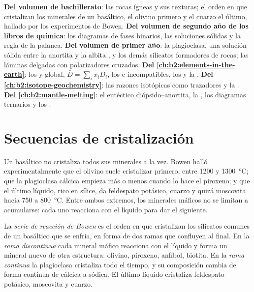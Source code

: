 \begin{recall}
\textbf{Del volumen de bachillerato}: las rocas ígneas y sus texturas; el orden
en que cristalizan los minerales de un  basáltico, el olivino primero y el cuarzo el último,
hallado por los experimentos de Bowen. \textbf{Del volumen de segundo año de los libros de química}:
los diagramas de fases binarios, las soluciones sólidas y la regla de la palanca. \textbf{Del volumen
de primer año}: la plagioclasa, una solución sólida entre la anortita  y la albita
, y los demás silicatos formadores de rocas; las láminas delgadas con polarizadores
cruzados. \textbf{Del \cref{ch:b2:elements-in-the-earth}}: los 
y global, $\bar D = \sum_i x_i D_i$, los  e incompatibles,
los  y la . \textbf{Del
\cref{ch:b2:isotope-geochemistry}}: las razones isotópicas como trazadores y la . \textbf{Del \cref{ch:b2:mantle-melting}}: el eutéctico diópsido--anortita,
la , los diagramas ternarios y los .
\end{recall}

\section{Secuencias de cristalización}\label{sec:b2:magmatic-differentiation:sequences}

Un  basáltico no cristaliza todos sus minerales a la vez. Bowen halló
experimentalmente que el olivino suele cristalizar primero, entre 1200 y
\qty{1300}{\celsius}; que la plagioclasa cálcica empieza más o menos cuando lo hace
el piroxeno; y que el último líquido, rico en sílice, da feldespato potásico, cuarzo y
quizá moscovita hacia 750 a \qty{800}{\celsius}. Entre ambos extremos, los minerales
máficos no se limitan a acumularse: cada uno reacciona con el líquido para dar el siguiente.

\begin{definition}\label{def:b2:magmatic-differentiation:bowen}
La \emph{serie de reacción de Bowen} es el orden en que
cristalizan los silicatos comunes de un  basáltico que se enfría, en forma de dos ramas
que confluyen al final. En la \emph{rama discontinua} cada mineral máfico
reacciona con el líquido y forma un mineral nuevo de otra estructura: olivino,
piroxeno, anfíbol, biotita. En la \emph{rama continua} la plagioclasa
cristaliza todo el tiempo, y su composición cambia de forma continua de cálcica
a sódica. El último líquido cristaliza feldespato potásico, moscovita y
cuarzo.
\end{definition}


